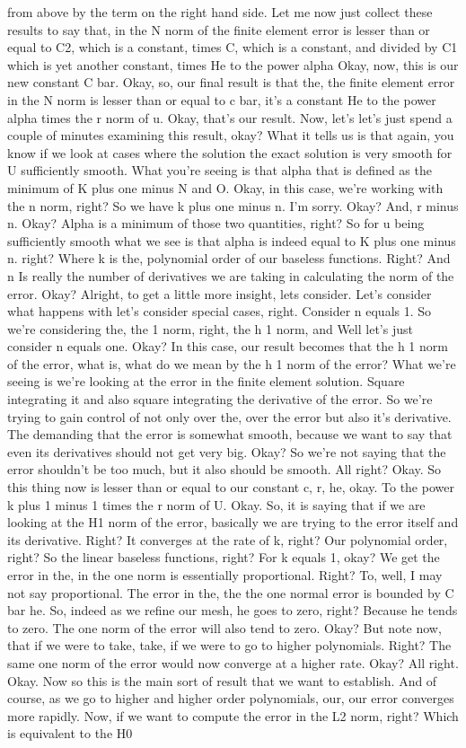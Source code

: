 \documentclass[10pt]{article}
\begin{document}
{from above by the term on the right hand side. Let me now just collect these results to say that, in the N norm of the finite element error is lesser than or equal to C2, which is a constant, times C, which is a constant, and divided by C1 which is yet another constant, times He to the power alpha Okay, now, this is our new constant C bar. Okay, so, our final result is that the, the finite element error in the N norm is lesser than or equal to c bar, it's a constant He to the power alpha times the r norm of u. Okay, that's our result. Now, let's let's just spend a couple of minutes examining this result, okay? What it tells us is that again, you know if we look at cases where the solution the exact solution is very smooth for U sufficiently smooth.  What you're seeing is that alpha that is defined as the minimum of K plus one minus N and O. Okay, in this case, we're working with the n norm, right? So we have k plus one minus n. I'm sorry. Okay? And, r minus n. Okay? Alpha is a minimum of those two quantities, right? So for u being sufficiently smooth what we see is that alpha is indeed equal to K plus one minus n. right? Where k is the, polynomial order of our baseless functions. Right? And n Is really the number of derivatives we are taking in calculating the norm of the error. Okay? Alright, to get a little more insight, lets consider. Let's consider what happens with let's consider special cases, right. Consider n equals 1. So we're considering the, the 1 norm, right, the h 1 norm, and Well let's just consider n equals one. Okay? In this case, our result becomes that the h 1 norm of the error, what is, what do we mean by the h 1 norm of the error? What we're seeing is we're looking at the error in the finite element solution. Square integrating it and also square integrating the derivative of the error. So we're trying to gain control of not only over the, over the error but also it's derivative. The demanding that the error is somewhat smooth, because we want to say that even its derivatives should not get very big. Okay? So we're not saying that the error shouldn't be too much, but it also should be smooth. All right? Okay. So this thing now is lesser than or equal to our constant c, r, he, okay. To the power k plus 1 minus 1 times the r norm of U. Okay. So, it is saying that if we are looking at the H1 norm of the error, basically we are trying to the error itself and its derivative. Right? It converges at the rate of k, right? Our polynomial order, right? So the linear baseless functions, right? For k equals 1, okay? We get the error in the, in the one norm is essentially proportional. Right? To, well, I may not say proportional. The error in the, the the one normal error is bounded by C bar he. So, indeed as we refine our mesh, he goes to zero, right? Because he tends to zero. The one norm of the error will also tend to zero. Okay? But note now, that if we were to take, take, if we were to go to higher polynomials. Right? The same one norm of the error would now converge at a higher rate. Okay? All right. Okay. Now so this is the main sort of result that we want to establish. And of course, as we go to higher and higher order polynomials, our, our error converges more rapidly. Now, if we want to compute the error in the L2 norm, right? Which is equivalent to the H0 }
\end{document}
